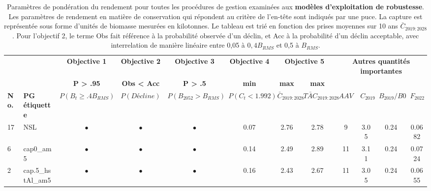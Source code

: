 \documentclass[11pt]{book}
\begin{document}
\begin{turn}
\begingroup\fontsize{7}{9}\selectfont
\begingroup\fontsize{7}{9}\selectfont
\begin{longtable}[t]{llcccccccccc}
\caption{\label{tab:unnamed-chunk-11}Paramètres de pondération du rendement pour toutes les procédures de gestion examinées aux \textbf{modèles d’exploitation de robustesse}. Les paramètres de rendement en matière de conservation qui répondent au critère de l’en-tête sont indiqués par une puce. La capture est représentée sous forme d’unités de biomasse mesurées en kilotonnes. Le tableau est trié en fonction des prises moyennes sur 10 ans $\bar{C}_{2019:2028}$. Pour l’objectif 2, le terme Obs fait référence à la probabilité observée d’un déclin, et Acc à la probabilité d’un déclin acceptable, avec interrelation de manière linéaire entre 0,05 à $0,4B_{RMS}$ et 0,5 à $B_{RMS}$.}\\
\toprule
\multicolumn{2}{c}{\textbf{ }} & \multicolumn{1}{c}{\textbf{Objective 1}} & \multicolumn{1}{c}{\textbf{Objective 2}} & \multicolumn{1}{c}{\textbf{Objective 3}} & \multicolumn{1}{c}{\textbf{Objective 4}} & \multicolumn{2}{c}{\textbf{Objective 5}} & \multicolumn{4}{c}{\textbf{Autres quantités importantes}} \\
\cmidrule(l{3pt}r{3pt}){3-3} \cmidrule(l{3pt}r{3pt}){4-4} \cmidrule(l{3pt}r{3pt}){5-5} \cmidrule(l{3pt}r{3pt}){6-6} \cmidrule(l{3pt}r{3pt}){7-8} \cmidrule(l{3pt}r{3pt}){9-12}
\multicolumn{2}{c}{\textbf{ }} & \multicolumn{1}{c}{\textbf{P > .95}} & \multicolumn{1}{c}{\textbf{Obs < Acc}} & \multicolumn{1}{c}{\textbf{P > .5}} & \multicolumn{1}{c}{\textbf{min}} & \multicolumn{1}{c}{\textbf{max}} & \multicolumn{1}{c}{\textbf{max}} & \multicolumn{4}{c}{\textbf{ }} \\
\cmidrule(l{3pt}r{3pt}){3-3} \cmidrule(l{3pt}r{3pt}){4-4} \cmidrule(l{3pt}r{3pt}){5-5} \cmidrule(l{3pt}r{3pt}){6-6} \cmidrule(l{3pt}r{3pt}){7-7} \cmidrule(l{3pt}r{3pt}){8-8}
\textbf{No.} & \textbf{PG étiquette} & \textbf{$P(B_t \geq .4B_{RMS})$} & \textbf{$P(Décline)$} & \textbf{$P(B_{2052} > B_{RMS})$} & \textbf{$P(C_t < 1.992)$} & \textbf{$\bar{C}_{2019:2028}$} & \textbf{$\bar{TAC}_{2019:2028}$} & \textbf{$AAV$} & \textbf{$C_{2019}$} & \textbf{$B_{2019}/B0$} & \textbf{$F_{2022}$}\\
\midrule
17 & NSL & $\bullet$ & $\bullet$ & $\bullet$ & 0.07 & 2.76 & 2.78 & 9 & 3.05 & 0.24 & 0.0682\\
6 & cap0\_am5 & $\bullet$ & $\bullet$ & $\bullet$ & 0.14 & 2.49 & 2.89 & 11 & 3.11 & 0.24 & 0.0724\\
2 & cap.5\_hstAl\_am5 & $\bullet$ & $\bullet$ & $\bullet$ & 0.16 & 2.43 & 2.67 & 11 & 3.05 & 0.24 & 0.0655\\

\end{longtable}
\end{turn}
\end{document}
